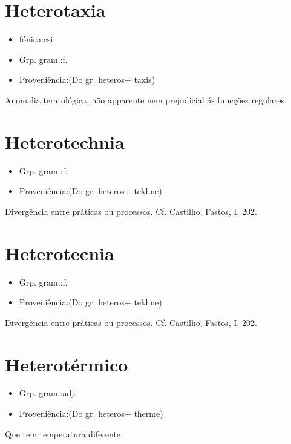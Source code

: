 \documentclass{article}
\begin{document}
\section{Heterotaxia}
\begin{itemize}
\item {fónica:csi}
\end{itemize}
\begin{itemize}
\item {Grp. gram.:f.}
\end{itemize}
\begin{itemize}
\item {Proveniência:(Do gr. \textunderscore heteros\textunderscore  + \textunderscore taxis\textunderscore )}
\end{itemize}
Anomalia teratológica, não apparente nem prejudicial ás funcções regulares.
\section{Heterotechnia}
\begin{itemize}
\item {Grp. gram.:f.}
\end{itemize}
\begin{itemize}
\item {Proveniência:(Do gr. \textunderscore heteros\textunderscore  + \textunderscore tekhne\textunderscore )}
\end{itemize}
Divergência entre práticas ou processos. Cf. Castilho, \textunderscore Fastos\textunderscore , I, 202.
\section{Heterotecnia}
\begin{itemize}
\item {Grp. gram.:f.}
\end{itemize}
\begin{itemize}
\item {Proveniência:(Do gr. \textunderscore heteros\textunderscore  + \textunderscore tekhne\textunderscore )}
\end{itemize}
Divergência entre práticas ou processos. Cf. Castilho, \textunderscore Fastos\textunderscore , I, 202.
\section{Heterotérmico}
\begin{itemize}
\item {Grp. gram.:adj.}
\end{itemize}
\begin{itemize}
\item {Proveniência:(Do gr. \textunderscore heteros\textunderscore  + \textunderscore therme\textunderscore )}
\end{itemize}
Que tem temperatura diferente.
\end{document}
